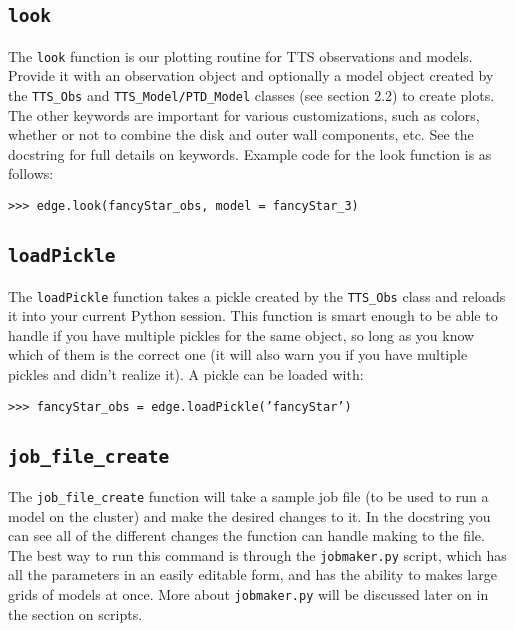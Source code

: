 \documentclass{article}
\begin{document}
\subsection{\texttt{look}}
 
The \texttt{look} function is our plotting routine for TTS observations and models. Provide it with an observation object and optionally a model object created by the \texttt{TTS\_Obs} and \texttt{TTS\_Model}\texttt{/PTD\_Model} classes (see section 2.2) to create plots. The other keywords are important for various customizations, such as colors, whether or not to combine the disk and outer wall components, etc. See the docstring for full details on keywords. Example code for the look function is as follows:

\vspace{2mm}
\texttt{>>> edge.look(fancyStar\_obs, model = fancyStar\_3)}
\vspace{2mm}

\subsection{\texttt{loadPickle}}

The \texttt{loadPickle} function takes a pickle created by the \texttt{TTS\_Obs} class and reloads it into your current Python session. This function is smart enough to be able to handle if you have multiple pickles for the same object, so long as you know which of them is the correct one (it will also warn you if you have multiple pickles and didn’t realize it). A pickle can be loaded with:

\vspace{2mm}
\texttt{>>> fancyStar\_obs = edge.loadPickle('fancyStar')}
\vspace{2mm}

\subsection{\texttt{job\_file\_create}}

The \texttt{job\_file\_create} function will take a sample job file (to be used to run a model on the cluster) and make the desired changes to it. In the docstring you can see all of the different changes the function can handle making to the file. The best way to run this command is through the \texttt{jobmaker.py} script, which has all the parameters in an easily editable form, and has the ability to makes large grids of models at once. More about \texttt{jobmaker.py} will be discussed later on in the section on scripts.
\end{document}
